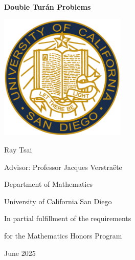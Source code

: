 \begin{titlepage}
    \begin{center}
        \Huge
        \textbf{Double Tur\'{a}n Problems}

        \vspace{1.5cm}
        \includegraphics[width=60mm]{images/University-of-California-San-Diego-Logo.png}

        \vspace{1.5cm}
        \LARGE

        Ray Tsai

        \Large

        Advisor: Professor Jacques Verstraëte
        
        \vspace{1cm}
        \large

        Department of Mathematics
        
        University of California San Diego

        \vspace{1cm}

        In partial fulfillment of the requirements

        for the Mathematics Honors Program
        
        \vspace{1cm}
        June 2025
    \end{center}
    
\end{titlepage}